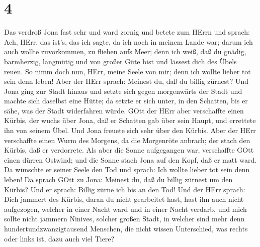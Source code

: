 \hypertarget{section-2}{%
\section{4}\label{section-2}}

 Das verdroß Jona fast sehr und ward zornig  und
betete zum HErrn und sprach: Ach, HErr, das ist's, das ich sagte, da ich
noch in meinem Lande war; darum ich auch wollte zuvorkommen, zu fliehen
aufs Meer; denn ich weiß, daß du gnädig, barmherzig, langmütig und von
großer Güte bist und lässest dich des Übels reuen.  So nimm
doch nun, HErr, meine Seele von mir; denn ich wollte lieber tot sein
denn leben!  Aber der HErr sprach: Meinest du, daß du billig
zürnest?  Und Jona ging zur Stadt hinaus und setzte sich
gegen morgenwärts der Stadt und machte sich daselbst eine Hütte; da
setzte er sich unter, in den Schatten, bis er sähe, was der Stadt
widerfahren würde.  GOtt der HErr aber verschaffte einen
Kürbis, der wuchs über Jona, daß er Schatten gab über sein Haupt, und
errettete ihn von seinem Übel. Und Jona freuete sich sehr über den
Kürbis.  Aber der HErr verschaffte einen Wurm des Morgens,
da die Morgenröte anbrach; der stach den Kürbis, daß er verdorrete.
 Als aber die Sonne aufgegangen war, verschaffte GOtt einen
dürren Ostwind; und die Sonne stach Jona auf den Kopf, daß er matt ward.
Da wünschte er seiner Seele den Tod und sprach: Ich wollte lieber tot
sein denn leben!  Da sprach GOtt zu Jona: Meinest du, daß du
billig zürnest um den Kürbis? Und er sprach: Billig zürne ich bis an den
Tod!  Und der HErr sprach: Dich jammert des Kürbis, daran
du nicht gearbeitet hast, hast ihn auch nicht aufgezogen, welcher in
einer Nacht ward und in einer Nacht verdarb,  und mich
sollte nicht jammern Ninives, solcher großen Stadt, in welcher sind mehr
denn hundertundzwanzigtausend Menschen, die nicht wissen Unterschied,
was rechts oder links ist, dazu auch viel Tiere?
